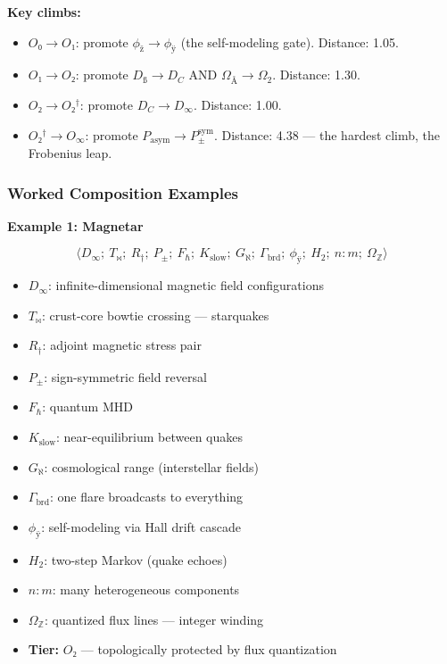 \documentclass[12pt,a4paper]{article}
\begin{document}
\textbf{Key climbs:}

\begin{itemize}
    \item $O₀ \to O₁$: promote $\phi_{\text{ž}} \to \phi_ÿ$ (the self-modeling gate). Distance: 1.05.
    \item $O₁ \to O₂$: promote $D_ß \to D_C$ AND $\Omega_{Å} \to \Omega_2$. Distance: 1.30.
    \item $O₂ \to O₂^\dagger$: promote $D_C \to D_{\infty}$. Distance: 1.00.
    \item $O₂^\dagger \to O_{\infty}$: promote $P_{\text{asym}} \to P_{\pm}^{\text{sym}}$. Distance: 4.38 --- the hardest climb, the Frobenius leap.
\end{itemize}

\subsubsection{Worked Composition Examples}

\textbf{Example 1: Magnetar}


\[\langle D_{\infty};\ T_{\bowtie};\ R_{\dagger};\ P_{\pm};\ F_{\hbar};\ K_{\text{slow}};\ G_{\aleph};\ \Gamma_{\text{brd}};\ \phi_ÿ;\ H_2;\ n{:}m;\ \Omega_\mathbb{Z} \rangle\]

\begin{itemize}
    \item $D_{\infty}$: infinite-dimensional magnetic field configurations
    \item $T_{\bowtie}$: crust-core bowtie crossing --- starquakes
    \item $R_{\dagger}$: adjoint magnetic stress pair
    \item $P_{\pm}$: sign-symmetric field reversal
    \item $F_{\hbar}$: quantum MHD
    \item $K_{\text{slow}}$: near-equilibrium between quakes
    \item $G_{\aleph}$: cosmological range (interstellar fields)
    \item $\Gamma_{\text{brd}}$: one flare broadcasts to everything
    \item $\phi_ÿ$: self-modeling via Hall drift cascade
    \item $H_2$: two-step Markov (quake echoes)
    \item $n{:}m$: many heterogeneous components
    \item $\Omega_\mathbb{Z}$: quantized flux lines --- integer winding
    \item \textbf{Tier:} $O₂$ --- topologically protected by flux quantization
\end{itemize}
\end{document}
